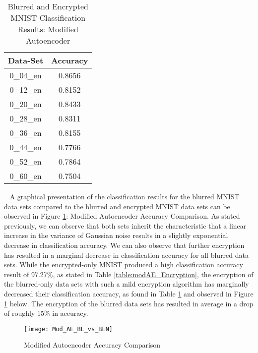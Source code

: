 \documentclass[12pt, titlepage]{article}
\begin{document}
\begin{table}[!h]
	\begin{center}
		\begin{tabular}{| c | c |}
			\hline
			\textbf{Data-Set} & \textbf{Accuracy}\\
			\hline
			0\_04\_en & 0.8656\\
			\hline
			0\_12\_en & 0.8152\\
			\hline
			0\_20\_en & 0.8433\\
			\hline
			0\_28\_en & 0.8311\\
			\hline
			0\_36\_en & 0.8155\\
			\hline
			0\_44\_en & 0.7766\\
			\hline
			0\_52\_en & 0.7864\\
			\hline
			0\_60\_en & 0.7504\\
			\hline
		\end{tabular}
		\caption{Blurred and Encrypted MNIST Classification Results: Modified Autoencoder}
		\label{table:modAE_BlurredEncrypted}
	\end{center}
\end{table}

~\newpage
\noindent A graphical presentation of the classification results for the blurred MNIST data sets compared to the blurred and encrypted MNIST data sets can be observed in Figure \ref{GRAPH_ModifiedAE}: Modified Autoencoder Accuracy Comparison. As stated previously, we can observe that both sets inherit the characteristic that a linear increase in the variance of Gaussian noise results in a slightly exponential decrease in classification accuracy. We can also observe that further encryption has resulted in a marginal decrease in classification accuracy for all blurred data sets. While the encrypted-only MNIST produced a high classification accuracy result of 97.27\%, as stated in Table \ref{table:modAE_Encryption}, the encryption of the blurred-only data sets with such a mild encryption algorithm has marginally decreased their classification accuracy, as found in Table \ref{table:modAE_BlurredEncrypted} and observed in Figure \ref{GRAPH_ModifiedAE} below. The encryption of the blurred data sets has resulted in average in a drop of roughly 15\% in accuracy.

\begin{figure}[h!]
	\begin{center}
		\texttt{[image: Mod\_AE\_BL\_vs\_BEN]}
		\caption{Modified Autoencoder Accuracy Comparison}
		\label{GRAPH_ModifiedAE}
	\end{center}
\end{figure} 
\end{document}
